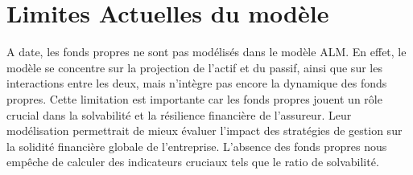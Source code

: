 \section{Limites Actuelles du modèle}
A date, les fonds propres ne sont pas modélisés dans le modèle ALM. En effet, le modèle se concentre sur la projection de l'actif et du passif, ainsi que sur les interactions entre les deux, mais n'intègre pas encore la dynamique des fonds propres. Cette limitation est importante car les fonds propres jouent un rôle crucial dans la solvabilité et la résilience financière de l'assureur. Leur modélisation permettrait de mieux évaluer l'impact des stratégies de gestion sur la solidité financière globale de l'entreprise. L'absence des fonds propres nous empêche de calculer des indicateurs cruciaux tels que le ratio de solvabilité.





